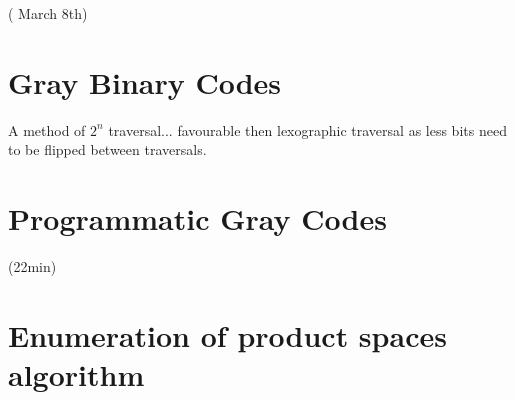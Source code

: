 \documentclass{article}
\begin{document}
( March 8th)
\section{Gray Binary Codes}
A method of $2^n$ traversal... favourable then lexographic traversal as less bits need to be flipped between traversals.

\section{Programmatic Gray Codes}
(22min)

\section{Enumeration of product spaces algorithm}
\end{document}

